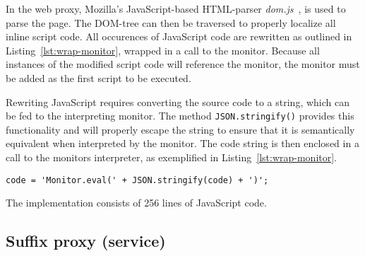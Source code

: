 \documentclass{llncs}
\begin{document}
In the web proxy, Mozilla's JavaScript-based HTML-parser \emph{dom.js}~\cite{Mozilla:dom.js}, is used 
to parse the page. The DOM-tree can then be traversed to properly localize 
all inline script code. All occurences of JavaScript code are rewritten as 
outlined in Listing~\ref{lst:wrap-monitor}, wrapped in a call to the monitor.
Because all instances of the modified script code will reference the monitor, 
the monitor must be added as the first script to be executed.


Rewriting JavaScript requires converting the source code to a string, which can 
be fed to the interpreting monitor. The method \lstinline{JSON.stringify()} 
provides this functionality and will properly escape the string to ensure that 
it is semantically equivalent when interpreted by the monitor. The code string is then enclosed in a call to the monitors 
interpreter, as exemplified in Listing~\ref{lst:wrap-monitor}.
\begin{lstlisting}[language=langsmall,label=lst:wrap-monitor, caption=Example of monitor wrapping]
code = 'Monitor.eval(' + JSON.stringify(code) + ')';
\end{lstlisting}
The implementation consists of 256 lines of JavaScript code.



\subsection{Suffix proxy (service)}



%
\end{document}
